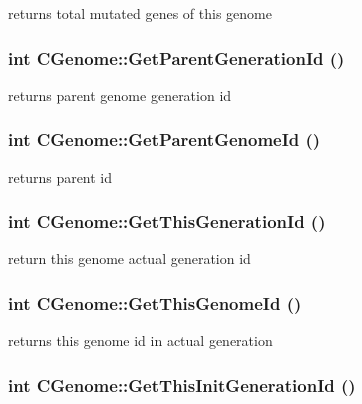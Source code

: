 \label{classCGenome_a06e87239b9570b6ece30d735218ad62e}
returns total mutated genes of this genome \hypertarget{classCGenome_a2c422e43eeba639adac8819bda493840}{
\subsubsection[{GetParentGenerationId}]{\setlength{\rightskip}{0pt plus 5cm}int CGenome::GetParentGenerationId ()}}
\label{classCGenome_a2c422e43eeba639adac8819bda493840}
returns parent genome generation id \hypertarget{classCGenome_a2d7df97b949060f67af3d459176d1579}{
\subsubsection[{GetParentGenomeId}]{\setlength{\rightskip}{0pt plus 5cm}int CGenome::GetParentGenomeId ()}}
\label{classCGenome_a2d7df97b949060f67af3d459176d1579}
returns parent id \hypertarget{classCGenome_a067c5f24d85af2dd94199a74b6bcc19a}{
\subsubsection[{GetThisGenerationId}]{\setlength{\rightskip}{0pt plus 5cm}int CGenome::GetThisGenerationId ()}}
\label{classCGenome_a067c5f24d85af2dd94199a74b6bcc19a}
return this genome actual generation id \hypertarget{classCGenome_a2db1857e39b167371d212f07a852a19e}{
\subsubsection[{GetThisGenomeId}]{\setlength{\rightskip}{0pt plus 5cm}int CGenome::GetThisGenomeId ()}}
\label{classCGenome_a2db1857e39b167371d212f07a852a19e}
returns this genome id in actual generation \hypertarget{classCGenome_a924b1fddb5b0941f38b1eb51da608c3c}{
\subsubsection[{GetThisInitGenerationId}]{\setlength{\rightskip}{0pt plus 5cm}int CGenome::GetThisInitGenerationId ()}}
